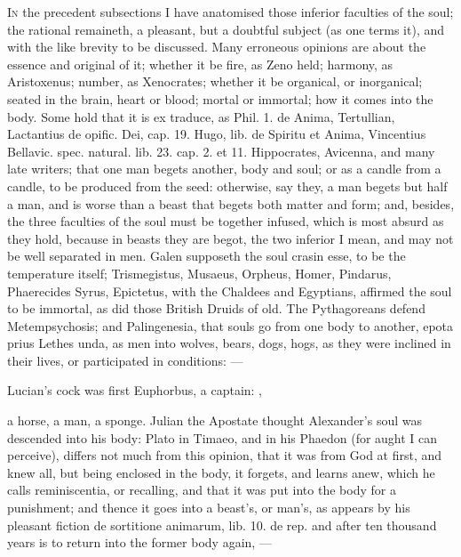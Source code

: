 {\lettrine{I}{n} the precedent subsections I have anatomised those inferior faculties
of the soul; the rational remaineth, a pleasant, but a doubtful subject
(as one terms it), and with the like brevity to be discussed. Many
erroneous opinions are about the essence and original of it; whether it
be fire, as Zeno held; harmony, as Aristoxenus; number, as Xenocrates;
whether it be organical, or inorganical; seated in the brain, heart or
blood; mortal or immortal; how it comes into the body. Some hold that
it is ex traduce, as Phil. 1. de Anima, Tertullian, Lactantius de
opific. Dei, cap. 19. Hugo, lib. de Spiritu et Anima, Vincentius
Bellavic. spec. natural. lib. 23. cap. 2. et 11. Hippocrates, Avicenna,
and many  late writers; that one man begets another, body and
soul; or as a candle from a candle, to be produced from the seed:
otherwise, say they, a man begets but half a man, and is worse than a
beast that begets both matter and form; and, besides, the three
faculties of the soul must be together infused, which is most absurd as
they hold, because in beasts they are begot, the two inferior I mean,
and may not be well separated in men.  Galen supposeth the soul
crasin esse, to be the temperature itself; \textlatin{Trismegistus}, Musaeus,
Orpheus, Homer, Pindarus, Phaerecides Syrus, Epictetus, with the
Chaldees and Egyptians, affirmed the soul to be immortal, as did those
British Druids of old. The Pythagoreans defend
Metempsychosis; and Palingenesia, that souls go from one body to
another, epota prius Lethes unda, as men into wolves, bears, dogs,
hogs, as they were inclined in their lives, or participated in
conditions:
---

Lucian's cock was first Euphorbus, a captain:
,

a horse, a man, a sponge. Julian the Apostate thought Alexander's
soul was descended into his body: Plato in Timaeo, and in his Phaedon (for aught I can perceive),
differs not much from this opinion, that it
was from God at first, and knew all, but being enclosed in the body, it
forgets, and learns anew, which he calls reminiscentia, or recalling,
and that it was put into the body for a punishment; and thence it goes
into a beast's, or man's, as appears by his pleasant fiction de
sortitione animarum, lib. 10. de rep. and after ten thousand
years is to return into the former body again,
---

}
